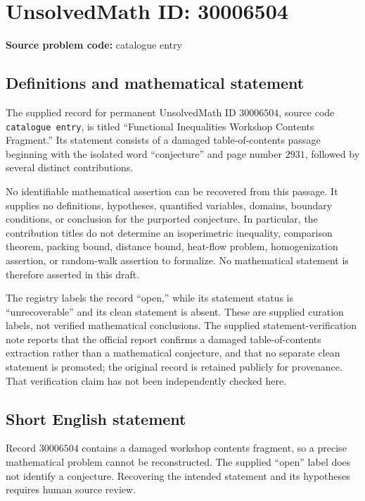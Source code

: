\documentclass[11pt]{article}
\begin{document}
\section*{UnsolvedMath ID: 30006504}
\textbf{Source problem code:} catalogue entry
\subsection{Definitions and mathematical statement}
The supplied record for permanent UnsolvedMath ID \(30006504\), source code \texttt{catalogue entry}, is titled ``Functional Inequalities Workshop Contents Fragment.'' Its statement consists of a damaged table-of-contents passage beginning with the isolated word ``conjecture'' and page number \(2931\), followed by several distinct contributions.

No identifiable mathematical assertion can be recovered from this passage. It supplies no definitions, hypotheses, quantified variables, domains, boundary conditions, or conclusion for the purported conjecture. In particular, the contribution titles do not determine an isoperimetric inequality, comparison theorem, packing bound, distance bound, heat-flow problem, homogenization assertion, or random-walk assertion to formalize. No mathematical statement is therefore asserted in this draft.

The registry labels the record ``open,'' while its statement status is ``unrecoverable'' and its clean statement is absent. These are supplied curation labels, not verified mathematical conclusions. The supplied statement-verification note reports that the official report confirms a damaged table-of-contents extraction rather than a mathematical conjecture, and that no separate clean statement is promoted; the original record is retained publicly for provenance. That verification claim has not been independently checked here.
\subsection{Short English statement}
Record \(30006504\) contains a damaged workshop contents fragment, so a precise mathematical problem cannot be reconstructed. The supplied ``open'' label does not identify a conjecture. Recovering the intended statement and its hypotheses requires human source review.
\end{document}
